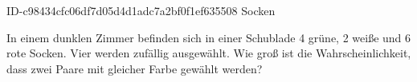 \begin{exercise}
      {ID-c98434cfc06df7d05d4d1adc7a2bf0f1ef635508}
      {Socken}
  \ifproblem\problem\par
    In einem dunklen Zimmer befinden sich in einer Schublade 4 grüne, 2 weiße und
    6 rote Socken. Vier werden zufällig ausgewählt. Wie groß ist die
    Wahrscheinlichkeit, dass zwei Paare mit gleicher Farbe gewählt werden?
  \fi
\end{exercise}
